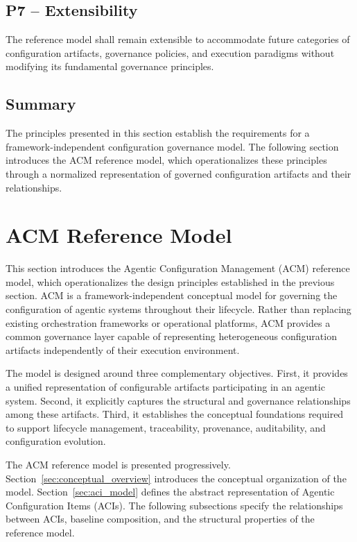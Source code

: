 \documentclass[10pt]{article}
\begin{document}
\subsection{P7 -- Extensibility}

The reference model shall remain extensible to accommodate future categories of configuration artifacts, governance policies, and execution paradigms without modifying its fundamental governance principles.

\subsection*{Summary}

The principles presented in this section establish the requirements for a framework-independent configuration governance model. The following section introduces the ACM reference model, which operationalizes these principles through a normalized representation of governed configuration artifacts and their relationships.

\section{ACM Reference Model}
\label{sec:reference_model}

This section introduces the Agentic Configuration Management (ACM) reference model, which operationalizes the design principles established in the previous section. ACM is a framework-independent conceptual model for governing the configuration of agentic systems throughout their lifecycle. Rather than replacing existing orchestration frameworks or operational platforms, ACM provides a common governance layer capable of representing heterogeneous configuration artifacts independently of their execution environment.

The model is designed around three complementary objectives. First, it provides a unified representation of configurable artifacts participating in an agentic system. Second, it explicitly captures the structural and governance relationships among these artifacts. Third, it establishes the conceptual foundations required to support lifecycle management, traceability, provenance, auditability, and configuration evolution.

The ACM reference model is presented progressively. Section~\ref{sec:conceptual_overview} introduces the conceptual organization of the model. Section~\ref{sec:aci_model} defines the abstract representation of Agentic Configuration Items (ACIs). The following subsections specify the relationships between ACIs, baseline composition, and the structural properties of the reference model.
\end{document}
